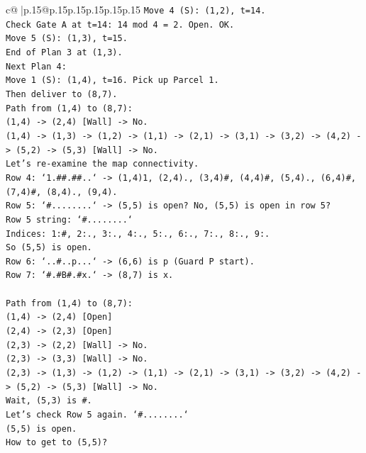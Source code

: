 \documentclass{article}
\begin{document}
{\begin{supertabular}{c@{$\;$}|p{.15\linewidth}@{}p{.15\linewidth}p{.15\linewidth}p{.15\linewidth}p{.15\linewidth}p{.15\linewidth}}
{{{\texttt{Move 4 (S): (1,2), t=14.} \\
\texttt{Check Gate A at t=14: 14 mod 4 = 2. Open. OK.} \\
\texttt{Move 5 (S): (1,3), t=15.} \\
\texttt{End of Plan 3 at (1,3).} \\
\texttt{Next Plan 4:} \\
\texttt{Move 1 (S): (1,4), t=16. Pick up Parcel 1.} \\
\texttt{Then deliver to (8,7).} \\
\texttt{Path from (1,4) to (8,7):} \\
\texttt{(1,4) {-}> (2,4) {[}Wall{]} {-}> No.} \\
\texttt{(1,4) {-}> (1,3) {-}> (1,2) {-}> (1,1) {-}> (2,1) {-}> (3,1) {-}> (3,2) {-}> (4,2) {-}> (5,2) {-}> (5,3) {[}Wall{]} {-}> No.} \\
\texttt{Let's re{-}examine the map connectivity.} \\
\texttt{Row 4: `1.\#\#.\#\#..` {-}> (1,4)1, (2,4)., (3,4)\#, (4,4)\#, (5,4)., (6,4)\#, (7,4)\#, (8,4)., (9,4).} \\
\texttt{Row 5: `\#........` {-}> (5,5) is open? No, (5,5) is open in row 5?} \\
\texttt{Row 5 string: `\#........`} \\
\texttt{Indices: 1:\#, 2:., 3:., 4:., 5:., 6:., 7:., 8:., 9:.} \\
\texttt{So (5,5) is open.} \\
\texttt{Row 6: `..\#..p...` {-}> (6,6) is p (Guard P start).} \\
\texttt{Row 7: `\#.\#B\#.\#x.` {-}> (8,7) is x.} \\
\\ 
\texttt{Path from (1,4) to (8,7):} \\
\texttt{(1,4) {-}> (2,4) {[}Open{]}} \\
\texttt{(2,4) {-}> (2,3) {[}Open{]}} \\
\texttt{(2,3) {-}> (2,2) {[}Wall{]} {-}> No.} \\
\texttt{(2,3) {-}> (3,3) {[}Wall{]} {-}> No.} \\
\texttt{(2,3) {-}> (1,3) {-}> (1,2) {-}> (1,1) {-}> (2,1) {-}> (3,1) {-}> (3,2) {-}> (4,2) {-}> (5,2) {-}> (5,3) {[}Wall{]} {-}> No.} \\
\texttt{Wait, (5,3) is \#.} \\
\texttt{Let's check Row 5 again. `\#........`} \\
\texttt{(5,5) is open.} \\
\texttt{How to get to (5,5)?} \\
}}}
\end{supertabular}}
\end{document}
